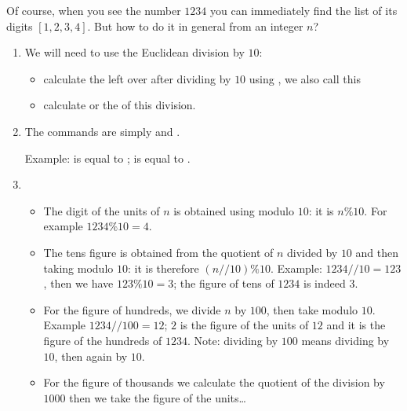 \documentclass[11pt,class=report,crop=false]{standalone}
\begin{document}
\begin{cours}

Of course, when you see the number $1234$ you can immediately find the list of its digits $[1,2,3,4]$. But how to do it in general from an integer $n$?
 
\begin{enumerate}
  \item We will need to use the Euclidean division by $10$:
  \begin{itemize}
    \item calculate the  left over after dividing by $10$ using , we also call this 
    \item calculate  or the  of this division. 
  \end{itemize}
  
  
  \item The \Python{} commands are simply  and .
  
  Example:  is equal to ;  is equal to .
  
  \item
  \begin{itemize}
    \item The digit of the units of $n$ is obtained using modulo $10$: it is $n\%10$. For example $1234 \% 10 = 4$.
    \item The tens figure is obtained from the quotient of $n$ 
    divided by $10$ and then taking modulo $10$: it is therefore $(n // 10) \% 10$.
   Example: $1234 // 10 = 123$, then we have $123 \% 10 = 3$; the figure of tens of $1234$ is indeed $3$.
   
   \item For the figure of hundreds, we divide $n$ by $100$, then take modulo $10$.  Example $1234 // 100 = 12$; $2$ is the figure of the units of $12$ and it is the figure of the hundreds of $1234$. Note: dividing by $100$ means dividing by $10$, then again by $10$.
   
   \item For the figure of thousands we calculate the quotient of the division by $1000$ then we take the figure of the units\ldots
   \end{itemize} 
 \end{enumerate}     

\end{cours}
\end{document}
